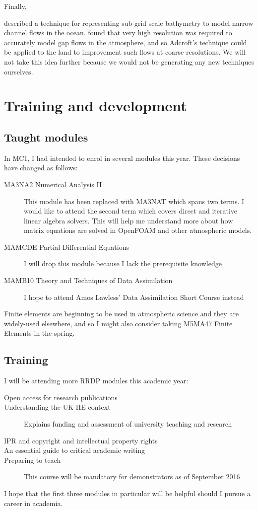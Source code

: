 \documentclass[a4paper]{article}
\begin{document}
Finally, {\citet{adcroft2013} described a technique for representing sub-grid scale bathymetry to model narrow channel flows in the ocean.  \citet{gohm2004} found that very high resolution was required to accurately model gap flows in the atmosphere, and so Adcroft's technique could be applied to the land to improvement such flows at coarse resolutions.  We will not take this idea further because we would not be generating any new techniques ourselves.


\section{Training and development}

\subsection*{Taught modules}
In MC1, I had intended to enrol in several modules this year.  These decisions have changed as follows:
\begin{description}
\item[MA3NA2 Numerical Analysis II]{This module has been replaced with MA3NAT which spans two terms.  I would like to attend the second term which covers direct and iterative linear algebra solvers.  This will help me understand more about how matrix equations are solved in OpenFOAM and other atmospheric models.}
\item[MAMCDE Partial Differential Equations]{I will drop this module because I lack the prerequisite knowledge}
\item[MAMB10 Theory and Techniques of Data Assimilation]{I hope to attend Amos Lawless' Data Assimilation Short Course instead}
\end{description}
Finite elements are beginning to be used in atmospheric science and they are widely-used elsewhere, and so I might also consider taking M5MA47 Finite Elements in the spring.

\subsection*{Training}
I will be attending more RRDP modules this academic year:
\begin{description}
	\item[Open access for research publications]{}
	\item[Understanding the UK HE context]{Explains funding and assessment of university teaching and research}
	\item[IPR and copyright and intellectual property rights]{}
	\item[An essential guide to critical academic writing]{}
	\item[Preparing to teach]{This course will be mandatory for demonstrators as of September 2016}
\end{description}
I hope that the first three modules in particular will be helpful should I pursue a career in academia.

}
\end{document}
